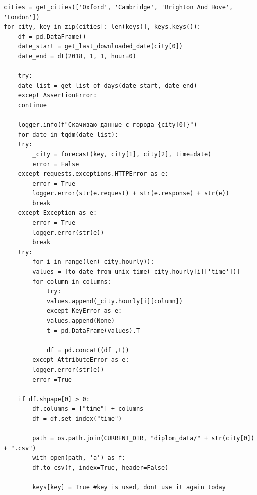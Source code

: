 \documentclass[11pt]{article}
\begin{document}
\begin{verbatim}
cities = get_cities(['Oxford', 'Cambridge', 'Brighton And Hove', 'London'])
for city, key in zip(cities[: len(keys)], keys.keys()): 
    df = pd.DataFrame()
    date_start = get_last_downloaded_date(city[0])
    date_end = dt(2018, 1, 1, hour=0)

    try:
	date_list = get_list_of_days(date_start, date_end)
    except AssertionError:
	continue

    logger.info(f"Скачиваю данные с города {city[0]}")
    for date in tqdm(date_list):
	try:
	    _city = forecast(key, city[1], city[2], time=date)
	    error = False
	except requests.exceptions.HTTPError as e:
	    error = True
	    logger.error(str(e.request) + str(e.response) + str(e))
	    break
	except Exception as e:
	    error = True
	    logger.error(str(e))
	    break
	try:
	    for i in range(len(_city.hourly)):
		values = [to_date_from_unix_time(_city.hourly[i]['time'])]
		for column in columns:
		    try:
			values.append(_city.hourly[i][column])
		    except KeyError as e:
			values.append(None)
		    t = pd.DataFrame(values).T

		    df = pd.concat((df ,t))
	    except AttributeError as e:
		logger.error(str(e))
		error =True

	if df.shpape[0] > 0:
	    df.columns = ["time"] + columns
	    df = df.set_index("time")

	    path = os.path.join(CURRENT_DIR, "diplom_data/" + str(city[0]) + ".csv")
	    with open(path, 'a') as f:
		df.to_csv(f, index=True, header=False)

		keys[key] = True #key is used, dont use it again today
\end{verbatim}
\end{document}
